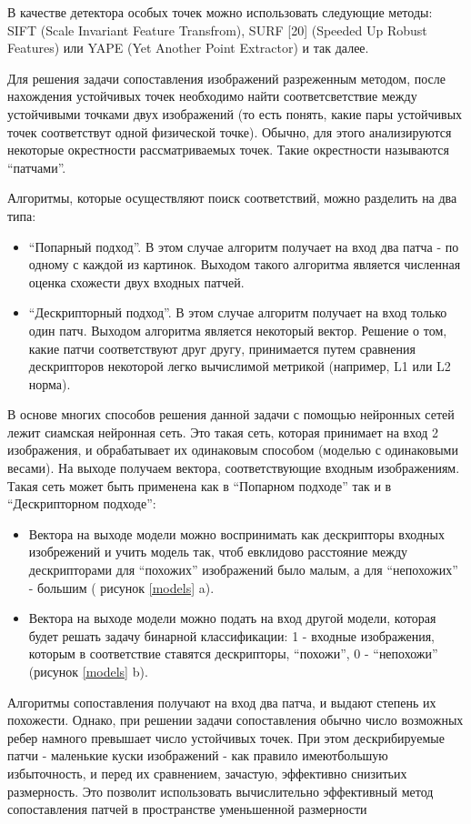 \documentclass[a4paper,12pt]{article}
\begin{document}
В качестве детектора особых точек можно использовать следующие методы:  SIFT (Scale Invariant Feature Transfrom), SURF [20] (Speeded Up Robust Features) или YAPE (Yet Another Point Extractor) и так далее.

Для решения задачи сопоставления изображений разреженным методом, после нахождения устойчивых точек необходимо найти соответсветствие между устойчивыми точками двух изображений (то есть понять, какие пары устойчивых точек соответствут одной физической точке). Обычно, для этого анализируются некоторые окрестности рассматриваемых точек. Такие окрестности называются “патчами”. 

Алгоритмы, которые осуществляют поиск соответствий, можно разделить на два типа:
\begin{itemize}
    \item “Попарный подход”. В этом случае алгоритм получает на вход два патча - по одному с каждой из картинок. Выходом такого алгоритма является численная оценка схожести двух входных патчей.
    \item “Дескрипторный подход”. В этом случае алгоритм получает на вход только один патч. Выходом алгоритма является некоторый вектор. Решение о том, какие патчи соответствуют друг другу, принимается путем сравнения дескрипторов некоторой легко вычислимой метрикой (например, L1 или L2 норма).
\end{itemize}

В основе многих способов решения данной задачи с помощью нейронных сетей лежит сиамская нейронная сеть. Это такая сеть, которая принимает на вход 2 изображения, и обрабатывает их одинаковым способом (моделью с одинаковыми весами). На выходе получаем вектора, соответствующие входным изображениям.
Такая сеть может быть применена как в “Попарном подходе” так и в “Дескрипторном подходе”: 
\begin{itemize}
    \item Вектора на выходе модели можно воспринимать как дескрипторы входных изобрежений и учить модель так, чтоб евклидово расстояние между дескрипторами для “похожих” изображений было малым, а для “непохожих” - большим ( рисунок \ref{models} a).
    \item Вектора на выходе модели можно подать на вход другой модели, которая будет решать задачу бинарной классификации: 1 - входные изображения, которым в соответствие ставятся дескрипторы, “похожи”, 0 -  “непохожи” (рисунок \ref{models} b).
\end{itemize}
Алгоритмы сопоставления получают на вход два патча, и выдают степень их похожести. Однако, при решении задачи сопоставления обычно число возможных ребер намного превышает число устойчивых точек. При этом дескрибируемые патчи - маленькие куски изображений - как правило имеютбольшую избыточность, и перед их сравнением, зачастую, эффективно снизитьих размерность. Это позволит использовать вычислительно эффективный метод сопоставления патчей в пространстве уменьшенной размерности
\end{document}
